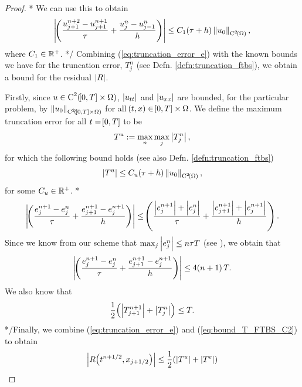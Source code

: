 \documentclass[final]{amsart}
\numberwithin{equation}{section}
\begin{document}
\begin{proof}
	\/*
	We can use this to obtain 
	\begin{equation}\label{eq:bound_R1}
	\left|\!\left({   \frac{u^{n+2}_{j+1}-u^{n+1}_{j+1}}{\tau}+
			\frac{u^n_j-u^n_{j-1}}{h}  }\right)\right|\leq C_1\!\left({\tau+h}\right)\left\|u_0\right\|_{\operatorname C^{2}\!\left({\Omega}\right)},
	\end{equation}
	where $C_1\in\mathbb R^+$.  
	*/	
	Combining (\ref{eq:truncation_error_e}) with the known bounds we have for the truncation error, $T^n_j$ (see Defn. \ref{defn:truncation_ftbs}), we  obtain a bound for the residual $\left|R\right|$.  
	
	Firstly, since $u\in\operatorname C^{2}\!\left({\!\left[{0,T}\right]\times\Omega}\right)$, $\left|u_{tt}\right|$ and $\left|u_{xx}\right|$ are bounded, for the particular problem, by $\left\|u_0\right\|_{\operatorname C^{2}\!\left({\!\left[{0,T}\right]\times\Omega}\right)}$ for all $\!\left({t,x}\right)\in\!\left[{0,T}\right]\times\Omega$.  We define the maximum truncation error for all $t=\!\left[{0,T}\right]$ to be 
	\begin{equation}\label{eq:ftbs_max_truncation}
	T^u:=\max_{n}\max_{j}\left|T^n_j\right|,
	\end{equation}
	for which the following bound holds (see also Defn. \ref{defn:truncation_ftbs})
	\begin{equation}\label{eq:bound_T_FTBS_C2}
	\left|T^u\right|\leq C_u\!\left({\tau+h}\right)\left\|u_0\right\|_{\operatorname C^{2}\!\left({\Omega}\right)},
	\end{equation}
	for  some $C_u\in\mathbb R^+$. 	\/*
	\begin{equation}
	\left|\!\left({\frac{e^{n+1}_j - e^n_j}{\tau}	
			+
			\frac{e^{n+1}_{j+1} - e^{n+1}_{j} }{h}}\right)
	\right|
	\leq
	\!\left({\frac{\left|e^{n+1}_j\right| + \left|e^n_j\right|}{\tau}	
		+
		\frac{\left|e^{n+1}_{j+1}\right| +\left| e^{n+1}_{j} \right|}{h}}\right).
	\end{equation}
	Since we know from our scheme that $\max_j\left|e^n_j\right|\leq n\tau T$ (see \cite[\S4.3]{morton2005numerical}), we obtain that 
	\begin{equation}\label{eq:bound_R2}
	\left|\!\left({\frac{e^{n+1}_j - e^n_j}{\tau}	
			+
			\frac{e^{n+1}_{j+1} - e^{n+1}_{j} }{h}}\right)
	\right|
	\leq
	4\!\left({n+1}\right)T.
	\end{equation}
	We also know that 
	\begin{equation}\label{eq:bound_R3}
	\frac{1}{2}\!\left({\left|T^{n+1}_{j+1}\right| +\left|T^{n}_{j}\right|}\right)\leq T.
	\end{equation}
	*/Finally, we combine  (\ref{eq:truncation_error_e}) and (\ref{eq:bound_T_FTBS_C2}) to obtain
	\begin{equation}\label{eq:bound_R_FTBS_C1}
	\begin{aligned}
	\abs{R\qp{t^{n+1/2},x_{j+1/2}}}
	&\leq 
	\frac{1}{2}\qp{\norm{T^u}+\norm{T^e}}\\

\end{aligned}
\end{equation}
\end{proof}
\end{document}
